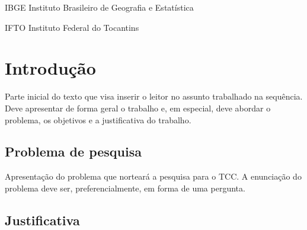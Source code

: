 \documentclass{ifto-tex}
\begin{document}
\listoftables*
\cleardoublepage

\begin{siglas}
	\item[IBGE]{Instituto Brasileiro de Geografia e Estatística}
	\item[IFTO]{Instituto Federal do Tocantins}
\end{siglas}


\tableofcontents*
\cleardoublepage


\textual

\chapter{Introdução}

	Parte inicial do texto que visa inserir o leitor no assunto trabalhado na sequência. Deve apresentar de forma geral o trabalho e, em especial, deve abordar o problema, os objetivos e a justificativa do trabalho.

	\section{Problema de pesquisa}
	
		Apresentação do problema que norteará a pesquisa para o TCC. A enunciação do problema deve ser,	preferencialmente, em forma de uma pergunta.
	
	\section{Justificativa}
	
\end{document}

